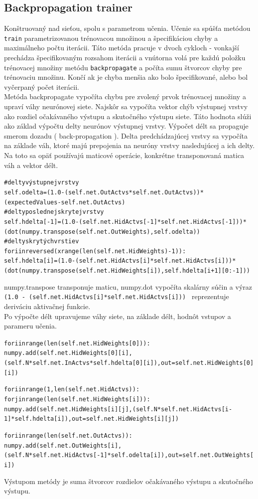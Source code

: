 \documentclass[11pt,a4paper]{article}
\begin{document}
\subsection{Backpropagation trainer}
Konštruovaný nad sieťou, spolu s parametrom učenia. Učenie sa spúšťa metódou \texttt{train} parametrizovanou 
trénovacou množinou a špecifikáciou chyby a maximálneho počtu iterácii. Táto metóda pracuje v dvoch cykloch - vonkajší prechádza špecifikovaným rozsahom iterácii a vnútorna volá pre každú položku trénovacej množiny metódu \texttt{backpropagate} a počíta sumu štvorcov chyby pre trénovaciu množinu. Končí ak je chyba menšia ako bolo špecifikované, alebo bol vyčerpaný počet iterácii.\\
Metóda backpropagate vypočíta chybu pre zvolený prvok trénovacej množiny a upraví váhy neurónovej siete.
Najskôr sa vypočíta vektor chýb výstupnej vrstvy ako rozdiel očakávaného výstupu a skutočného výstupu siete. Táto hodnota slúži ako základ výpočtu delty neurónov výstupnej vrstvy. Výpočet délt sa propaguje smerom dozadu ( back-propagation ). Delta predchádzajúcej vrstvy sa vypočíta na základe váh, ktoré majú prepojenia na neuróny vrstvy nasledujúcej a ich delty. Na toto sa opäť používajú maticové operácie, konkrétne transponovaná matica váh a vektor délt.
\begin{alltt}
\begin{small}
\#delty výstupnej vrstvy
self.odelta = (1.0 - (self.net.OutActvs*self.net.OutActvs))*(expectedValues - self.net.OutActvs)
\#delty poslednej skrytej vrstvy
self.hdelta[-1] = (1.0-(self.net.HidActvs[-1]*self.net.HidActvs[-1]))*(dot(numpy.transpose(self.net.OutWeights),self.odelta) )
\#delty skrytých vrstiev
for i in reversed(xrange(len(self.net.HidWeights) - 1)):
	self.hdelta[i] = (1.0 - (self.net.HidActvs[i]*self.net.HidActvs[i]))*( dot(numpy.transpose(self.net.HidWeights[i]),self.hdelta[i+1][0:-1]) )
\end{small}
\end{alltt}
numpy.transpose transponuje maticu, numpy.dot vypočíta skalárny súčin a výraz
\texttt{(1.0 - (self.net.HidActvs[i]*self.net.HidActvs[i])) } reprezentuje deriváciu aktivačnej funkcie.\\
Po výpočte délt upravujeme váhy siete, na základe délt, hodnôt vstupov a parameru učenia.
\begin{alltt}
\begin{small}
for i in range(len(self.net.HidWeights[0])):
	numpy.add(self.net.HidWeights[0][i], (self.N*self.net.InActvs*self.hdelta[0][i]), out = self.net.HidWeights[0][i])

for i in range(1, len(self.net.HidActvs)):
	for j in range(len(self.net.HidWeights[i])):
		numpy.add(self.net.HidWeights[i][j], (self.N*self.net.HidActvs[i-1]*self.hdelta[i]), out = self.net.HidWeights[i][j])

for i in range(len(self.net.OutActvs)):
	numpy.add(self.net.OutWeights[i], (self.N*self.net.HidActvs[-1]*self.odelta[i]), out = self.net.OutWeights[i])
\end{small}
\end{alltt}
Výstupom metódy je suma štvorcov rozdielov očakávaného výstupu a skutočného výstupu.
\end{document}
